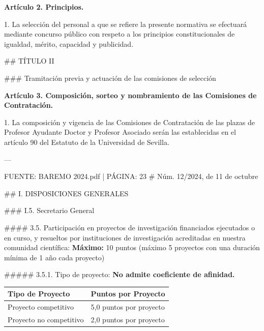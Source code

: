 \documentclass{article}
\begin{document}
\begin{itemize}
\begin{itemize}
\begin{scriptsize}
                  \textbf{Artículo 2. Principios.}

                  1. La selección del personal a que se refiere la presente normativa se efectuará mediante concurso público con respeto a los principios constitucionales de igualdad, mérito, capacidad y publicidad.

                  \#\# TÍTULO II

                  \#\#\# Tramitación previa y actuación de las comisiones de selección

                  \textbf{Artículo 3. Composición, sorteo y nombramiento de las Comisiones de Contratación.}

                  1. La composición y vigencia de las Comisiones de Contratación de las plazas de Profesor Ayudante Doctor y Profesor Asociado serán las establecidas en el artículo 90 del Estatuto de la Universidad de Sevilla.

                  ---

                  FUENTE: BAREMO 2024.pdf | PÁGINA: 23
                  \# Núm. 12/2024, de 11 de octubre

                  \#\# I. DISPOSICIONES GENERALES

                  \#\#\# I.5. Secretario General

                  \#\#\#\# 3.5. Participación en proyectos de investigación
                  financiados ejecutados o en curso, y resueltos por instituciones de investigación acreditadas en nuestra comunidad científica:
                  \textbf{Máximo:} 10 puntos
                  (máximo 5 proyectos con una duración mínima de 1 año cada proyecto)

                  \#\#\#\#\# 3.5.1. Tipo de proyecto:
                  \textbf{No admite coeficiente de afinidad.}

                  \vspace{0.4cm}
                  \begin{table}[h!]\centering\renewcommand{\arraystretch}{1.3}
                    \begin{tabular}{|p{}|p{}|}\hline
                      Tipo de Proyecto        & Puntos por Proyecto     \\\hline
                      Proyecto competitivo    & 5,0 puntos por proyecto \\\hline
                      Proyecto no competitivo & 2,0 puntos por proyecto \\\hline
                    \end{tabular}\end{table}
                  \vspace{0.4cm}


\end{scriptsize}
\end{itemize}
\end{itemize}
\end{document}
